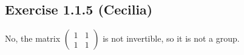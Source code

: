 \subsection*{Exercise 1.1.5 (Cecilia)}

No, the matrix $ \left(\begin{array}{cc}
  1 & 1 \\
  1 & 1
\end{array}\right) $ is not invertible, so it is not a group.